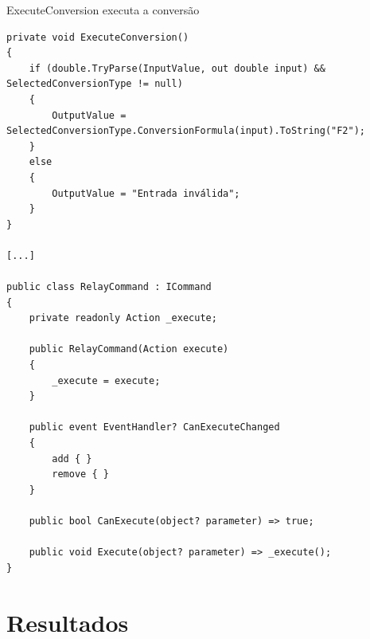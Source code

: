 \documentclass[
	12pt,				%
	oneside,			%
	a4paper,			%
	english,			%
	brazil,				%
	]{abntex2}
\begin{document}
{ExecuteConversion executa a conversão

\begin{verbatim}
private void ExecuteConversion()
{
    if (double.TryParse(InputValue, out double input) && SelectedConversionType != null)
    {
        OutputValue = SelectedConversionType.ConversionFormula(input).ToString("F2");
    }
    else
    {
        OutputValue = "Entrada inválida";
    }
}

[...]

public class RelayCommand : ICommand
{
    private readonly Action _execute;

    public RelayCommand(Action execute)
    {
        _execute = execute;
    }

    public event EventHandler? CanExecuteChanged
    {
        add { }
        remove { }
    }

    public bool CanExecute(object? parameter) => true;

    public void Execute(object? parameter) => _execute();
}
\end{verbatim}

\section{Resultados}


}
\end{document}
